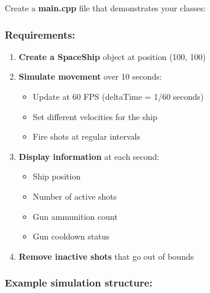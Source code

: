 \documentclass[
]{article}
\providecommand{\tightlist}{%
  \setlength{\itemsep}{0pt}\setlength{\parskip}{0pt}}
\begin{document}
Create a \textbf{main.cpp} file that demonstrates your classes:

\subsubsection{Requirements:}\label{requirements-3}

\begin{enumerate}
\def\labelenumi{\arabic{enumi}.}
\tightlist
\item
  \textbf{Create a SpaceShip} object at position (100, 100)
\item
  \textbf{Simulate movement} over 10 seconds:

  \begin{itemize}
  \tightlist
  \item
    Update at 60 FPS (deltaTime = 1/60 seconds)
  \item
    Set different velocities for the ship
  \item
    Fire shots at regular intervals
  \end{itemize}
\item
  \textbf{Display information} at each second:

  \begin{itemize}
  \tightlist
  \item
    Ship position
  \item
    Number of active shots
  \item
    Gun ammunition count
  \item
    Gun cooldown status
  \end{itemize}
\item
  \textbf{Remove inactive shots} that go out of bounds
\end{enumerate}

\subsubsection{Example simulation
structure:}\label{example-simulation-structure}
\end{document}
